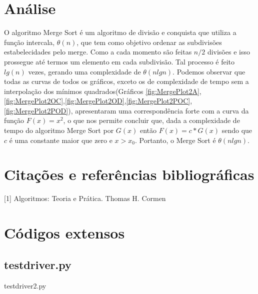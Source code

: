 \documentclass[12pt,a4paper,twoside]{report}
\begin{document}
\chapter{Análise}

O algoritmo Merge Sort é um algoritmo de divisão e conquista que utiliza a função intercala, $\theta(n)$, que tem como objetivo ordenar as subdivisões estabelecidades pelo merge. Como a cada momento são feitas $n/2$ divisões e isso prossegue até termos um elemento em cada subdivisão. Tal processo é feito $lg (n)$ vezes, gerando uma complexidade de $\theta(nlgn)$.
Podemos observar que todas as curvas de todos os gráficos, exceto os de complexidade de tempo sem a interpolação dos mínimos quadrados(Gráficos \ref{fig:MergePlot2A},\ref{fig:MergePlot2OC},\ref{fig:MergePlot2OD},\ref{fig:MergePlot2POC},\ref{fig:MergePlot2POD}), apresentaram uma correspondência forte com a curva da função $F(x) = x^2$, o que nos permite concluir que, dada a complexidade de tempo do algoritmo Merge Sort por $G(x)$ então $F(x) = c * G(x)$ sendo que $c$ é uma constante maior que zero e $x > x_0$. Portanto, o Merge Sort é $\theta(nlgn)$.

\chapter{Citações e referências bibliográficas}
[1] Algoritmos: Teoria e Prática. Thomas H. Cormen
		\date{Today}






\clearpage
{}
\appendix

\chapter{Códigos extensos \label{ap:testdriver}}
\section{testdriver.py}
 {testdriver2.py}
\end{document}
